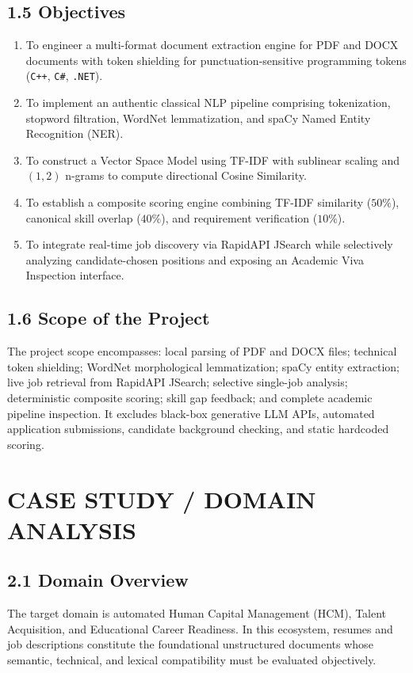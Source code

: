 \documentclass[11pt,a4paper]{article}
\begin{document}
\subsection{1.5 Objectives}
\begin{enumerate}[noitemsep]
    \item To engineer a multi-format document extraction engine for PDF and DOCX documents with token shielding for punctuation-sensitive programming tokens (\texttt{C++}, \texttt{C\#}, \texttt{.NET}).
    \item To implement an authentic classical NLP pipeline comprising tokenization, stopword filtration, WordNet lemmatization, and spaCy Named Entity Recognition (NER).
    \item To construct a Vector Space Model using TF-IDF with sublinear scaling and $(1, 2)$ n-grams to compute directional Cosine Similarity.
    \item To establish a composite scoring engine combining TF-IDF similarity ($50\%$), canonical skill overlap ($40\%$), and requirement verification ($10\%$).
    \item To integrate real-time job discovery via RapidAPI JSearch while selectively analyzing candidate-chosen positions and exposing an Academic Viva Inspection interface.
\end{enumerate}

\subsection{1.6 Scope of the Project}
The project scope encompasses: local parsing of PDF and DOCX files; technical token shielding; WordNet morphological lemmatization; spaCy entity extraction; live job retrieval from RapidAPI JSearch; selective single-job analysis; deterministic composite scoring; skill gap feedback; and complete academic pipeline inspection. It excludes black-box generative LLM APIs, automated application submissions, candidate background checking, and static hardcoded scoring.

\newpage

\section{CASE STUDY / DOMAIN ANALYSIS}

\subsection{2.1 Domain Overview}
The target domain is automated Human Capital Management (HCM), Talent Acquisition, and Educational Career Readiness. In this ecosystem, resumes and job descriptions constitute the foundational unstructured documents whose semantic, technical, and lexical compatibility must be evaluated objectively.
\end{document}
